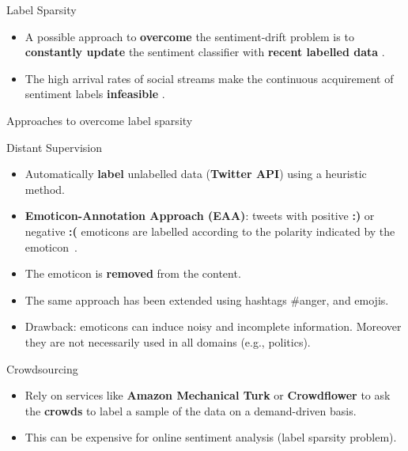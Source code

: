 \documentclass[handout]{beamer}
\begin{document}
\begin{frame}{Label Sparsity}
\begin{scriptsize}

\begin{itemize}
\item A possible approach to \textbf{overcome} the sentiment-drift problem is to 
\textbf{constantly update} the sentiment classifier with \textbf{recent labelled data} \cite{bifet2010, Silva2011}.

\item The high arrival rates of social streams make the continuous acquirement of sentiment labels \textbf{infeasible} \cite{Silva2011, calais2011bias,Guerra2014}. 
\end{itemize}

\end{scriptsize}

\end{frame}


\begin{frame}{Approaches to overcome label sparsity}
\begin{scriptsize}
\begin{block}{Distant Supervision}
  \begin{itemize}
   \item Automatically \textbf{label} unlabelled data (\textbf{Twitter API}) using a heuristic method.
   \item \textbf{Emoticon-Annotation Approach (EAA)}: tweets with positive \textcolor[rgb]{0.00,0.00,1.00}{\textbf{:)}} or negative \textcolor[rgb]{1.00,0.00,0.00}{\textbf{:(}} emoticons are labelled according to the polarity indicated by the emoticon~\cite{Read2005}.
  \item The emoticon is \textbf{removed} from the content.
  \item The same approach has been extended using hashtags \#anger, and emojis.
\item Drawback: emoticons can induce noisy and incomplete information. Moreover they are not necessarily used in all domains (e.g., politics). 
\end{itemize} 
 
\end{block}

\begin{block}{Crowdsourcing}
  \begin{itemize}
\item Rely on services like \textbf{Amazon Mechanical Turk} or \textbf{Crowdflower} to ask the \textbf{crowds} to label a sample of the data on a demand-driven basis.
\item This can be expensive for online sentiment analysis (label sparsity problem). 
   \end{itemize} 
 
\end{block}

\end{scriptsize}

\end{frame}
\end{document}
